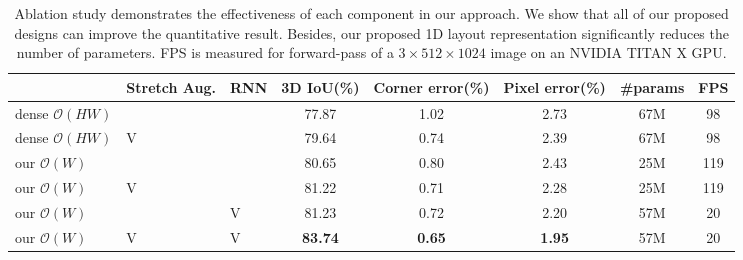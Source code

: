 \documentclass[10pt,twocolumn,letterpaper]{article}
\begin{document}
\begin{table*}[h]
    \centering
    \begin{tabular}{| >{\centering\arraybackslash} m{2.4cm}  >{\centering\arraybackslash} m{1.8cm}  >{\centering\arraybackslash} m{0.8cm} ||c|c|c||c|c|} 
        \hline
        {Output Shape} & {Stretch Aug.} & RNN & 3D IoU(\%) & {Corner error(\%)} & {Pixel error(\%)} & {\#params} & {FPS} \\
        \hline\hline
        dense $\mathcal{O}(HW)$ &   &   & 77.87 & 1.02 & 2.73 & 67M & 98 \\
        \hline
        dense $\mathcal{O}(HW)$ & V &   & 79.64 & 0.74 & 2.39 & 67M & 98 \\
        \hline
        our $\mathcal{O}(W)$ &   &   & 80.65 & 0.80 & 2.43 & 25M & 119 \\
        \hline
        our $\mathcal{O}(W)$ & V &   & 81.22 & 0.71 & 2.28 & 25M & 119 \\
        \hline
        our $\mathcal{O}(W)$ &   & V & 81.23 & 0.72 & 2.20 & 57M & 20 \\
        \hline
        our $\mathcal{O}(W)$ & V & V & \textbf{83.74} & \textbf{0.65} & \textbf{1.95} & 57M & 20 \\
        \hline
    \end{tabular}

    \caption{
    Ablation study demonstrates the effectiveness of each component in our approach.
    We show that all of our proposed designs can improve the quantitative result.
    Besides, our proposed 1D layout representation significantly reduces the number of parameters.
    FPS is measured for forward-pass of a $3 \times 512 \times 1024$ image on an NVIDIA TITAN X GPU.
    } 
    \label{table:ablation}
\end{table*}
\end{document}
